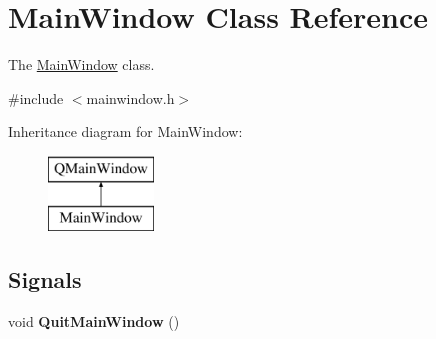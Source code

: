 \hypertarget{classMainWindow}{\section{Main\-Window Class Reference}
\label{classMainWindow}
}


The \hyperlink{classMainWindow}{Main\-Window} class.  




{\ttfamily \#include $<$mainwindow.\-h$>$}

Inheritance diagram for Main\-Window\-:\begin{figure}[H]
\begin{center}
\leavevmode
\includegraphics[height=2.000000cm]{classMainWindow}
\end{center}
\end{figure}
\subsection*{Signals}
\begin{DoxyCompactItemize}
\item 
\hypertarget{classMainWindow_a9707f0cc964479508e125742fcf94f82}{void {\bfseries Quit\-Main\-Window} ()}\label{classMainWindow_a9707f0cc964479508e125742fcf94f82}

\end{DoxyCompactItemize}
